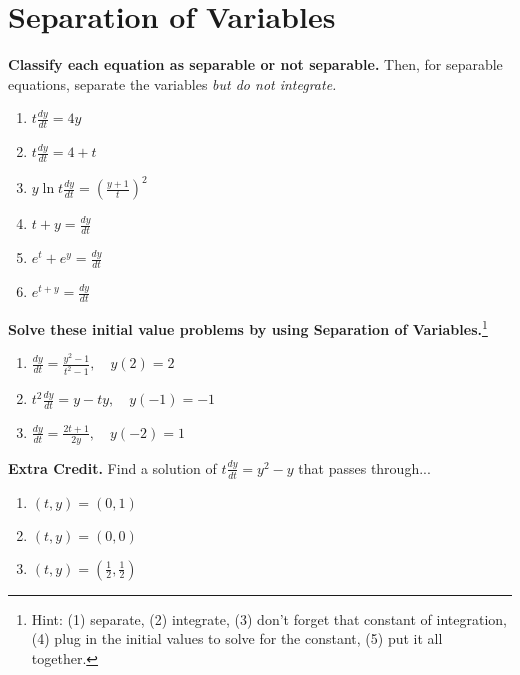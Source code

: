 \documentclass[11pt,onecolumn,superscriptaddress,notitlepage]{article}
\newcommand{\dy}[0]{\displaystyle\frac{dy}{dt}}
\begin{document}
\clearpage
\section*{Separation of Variables}

{\bf Classify each equation as separable or not separable.}  Then, for separable equations, separate the variables {\it but do not integrate.}
\begin{enumerate}[resume]
	\item $t \dy = 4y$
	\item $t \dy = 4+t$
	\item $y \ln t \dy = \left(\frac{y+1}{t}\right)^2$
	\item $t + y = \dy$
	\item $e^t + e^y = \dy$
	\item $e^{t+y} = \dy$
\end{enumerate}

{\bf Solve these initial value problems by using Separation of Variables.}\footnote{Hint: (1) separate, (2) integrate, (3) don't forget that constant of integration, (4) plug in the initial values to solve for the constant, (5) put it all together.}
\begin{enumerate}[resume]
	\item $\dy = \frac{y^2-1}{t^2-1}, \quad y(2)=2$
	\item $t^2 \dy = y-ty,\quad y(-1) = -1$
	\item $\dy = \frac{2t + 1}{2y},\quad y(-2) = 1$
\end{enumerate}

{\bf Extra Credit.} Find a solution of $\displaystyle t \dy = y^2 - y$ that passes through...
\begin{enumerate}[resume]
	\item $(t,y) = (0,1)$
	\item $(t,y) = (0,0)$
	\item $(t,y) = (\tfrac{1}{2},\tfrac{1}{2})$
\end{enumerate}

\end{document}
